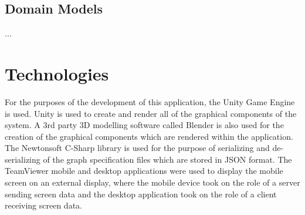 \documentclass[12pt]{article}
\begin{document}
\subsection{Domain Models}
...
\section{Technologies}
For the purposes of the development of this application, the Unity Game Engine is used. Unity is used to create and render all of the graphical components of the system. A 3rd party 3D modelling software called Blender is also used for the creation of the graphical components which are rendered within the application. The Newtonsoft C-Sharp library is used for the purpose of serializing and de-serializing of the graph specification files which are stored in JSON format. The TeamViewer mobile and desktop applications were used to display the mobile screen on an external display, where the mobile device took on the role of a server sending screen data and the desktop application took on the role of a client receiving screen data.
\end{document}
